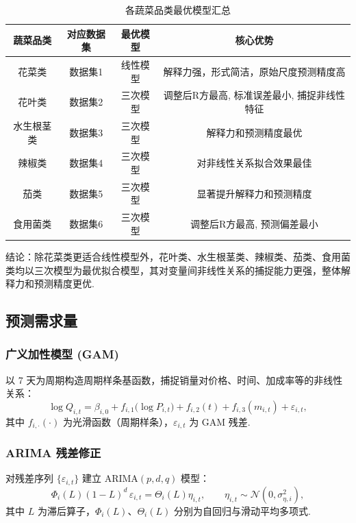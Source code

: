 \documentclass{cumcmthesis}
\begin{document}
\begin{table}[H]
\centering
\begin{tabular}{cccc}
\hline
蔬菜品类 & 对应数据集 & 最优模型 & 核心优势 \\
\hline
花菜类 & 数据集1 & 线性模型 & 解释力强，形式简洁，原始尺度预测精度高 \\
花叶类 & 数据集2 & 三次模型 & 调整后R方最高, 标准误差最小, 捕捉非线性特征 \\
水生根茎类 & 数据集3 & 三次模型 & 解释力和预测精度最优 \\
辣椒类 & 数据集4 & 三次模型 & 对非线性关系拟合效果最佳 \\
茄类 & 数据集5 & 三次模型 & 显著提升解释力和预测精度 \\
食用菌类 & 数据集6 & 三次模型 & 调整后R方最高, 预测偏差最小 \\
\hline
\end{tabular}
\caption{各蔬菜品类最优模型汇总}
\label{tab:best_models}
\end{table}

结论：除花菜类更适合线性模型外，花叶类、水生根茎类、辣椒类、茄类、食用菌类均以三次模型为最优拟合模型，其对变量间非线性关系的捕捉能力更强，整体解释力和预测精度更优. 

\subsection{预测需求量} 
\subsubsection{广义加性模型 (GAM)} 
以 7 天为周期构造周期样条基函数，捕捉销量对价格、时间、加成率等的非线性关系：
\begin{equation}
\log Q_{i,t} = \beta_{i,0} 
+ f_{i,1}\bigl(\log P_{i,t}\bigr) 
+ f_{i,2}(t) 
+ f_{i,3}(m_{i,t}) 
+ \varepsilon_{i,t},
\label{eq:GAM}
\end{equation}
其中 $f_{i,\cdot}(\cdot)$ 为光滑函数（周期样条），$\varepsilon_{i,t}$ 为 GAM 残差.

\subsubsection{ARIMA 残差修正}
对残差序列 $\{\varepsilon_{i,t}\}$ 建立 ARIMA$(p,d,q)$ 模型：
\begin{equation}
\Phi_i(L)(1-L)^d\,\varepsilon_{i,t} = \Theta_i(L)\eta_{i,t},
\qquad \eta_{i,t}\sim\mathcal{N}(0,\sigma_{\eta,i}^2),
\label{eq:ARIMA}
\end{equation}
其中 $L$ 为滞后算子，$\Phi_i(L)$、$\Theta_i(L)$ 分别为自回归与滑动平均多项式.
\end{document}
